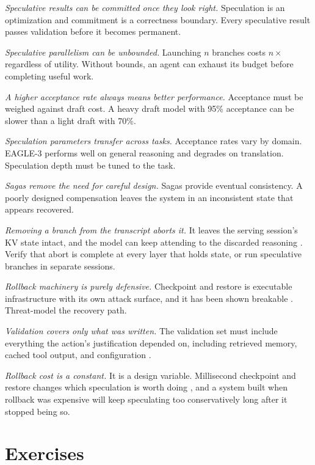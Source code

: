 \documentclass[11pt]{book}
\begin{document}
\textit{Speculative results can be committed once they look right.} Speculation is an optimization and commitment is a correctness boundary. Every speculative result passes validation before it becomes permanent.

\textit{Speculative parallelism can be unbounded.} Launching $n$ branches costs $n\times$ regardless of utility. Without bounds, an agent can exhaust its budget before completing useful work.

\textit{A higher acceptance rate always means better performance.} Acceptance must be weighed against draft cost. A heavy draft model with 95\% acceptance can be slower than a light draft with 70\%.

\textit{Speculation parameters transfer across tasks.} Acceptance rates vary by domain. EAGLE-3 performs well on general reasoning and degrades on translation. Speculation depth must be tuned to the task.

\textit{Sagas remove the need for careful design.} Sagas provide eventual consistency. A poorly designed compensation leaves the system in an inconsistent state that appears recovered.

\textit{Removing a branch from the transcript aborts it.} It leaves the serving session's KV state intact, and the model can keep attending to the discarded reasoning \cite{abortedkv2026}. Verify that abort is complete at every layer that holds state, or run speculative branches in separate sessions.

\textit{Rollback machinery is purely defensive.} Checkpoint and restore is executable infrastructure with its own attack surface, and it has been shown breakable \cite{saferesume2026}. Threat-model the recovery path.

\textit{Validation covers only what was written.} The validation set must include everything the action's justification depended on, including retrieved memory, cached tool output, and configuration \cite{coagent2026}.

\textit{Rollback cost is a constant.} It is a design variable. Millisecond checkpoint and restore changes which speculation is worth doing \cite{deltabox2026, crab2026}, and a system built when rollback was expensive will keep speculating too conservatively long after it stopped being so.

\section*{Exercises}
\end{document}
